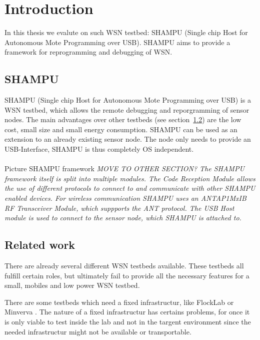 \chapter{Introduction}


In this thesis we evalute on such WSN testbed: SHAMPU (Single chip Host for Autonomous Mote Programming over USB). SHAMPU aims to provide a framework for reprogramming and debugging of WSN. 


\section{SHAMPU}

SHAMPU (Single chip Host for Autonomous Mote Programming over USB) \cite{Smeets:2014:DAL:2602339.2602401} is a WSN testbed, which allows the remote debugging and reporgramming of sensor nodes. The main advantages over other testbeds (see section~\ref{sec:related_work}) are the low cost, small size and small energy consumption. SHAMPU can be used as an extension to an already existing sensor node. The node only needs to provide an USB-Interface, SHAMPU is thus completely OS independent.\\\\

Picture SHAMPU framework
\textit{ MOVE TO OTHER SECTION?
The SHAMPU framework itself is split into multiple modules. The Code Reception Module allows the use of different protocols to connect to and communicate with other SHAMPU enabled devices. For wireless communication SHAMPU uses an ANTAP1MxIB RF Transceiver Module, which suppports the ANT protocol. The USB Host module is used to connect to the sensor node, which SHAMPU is attached to. }

\section{Related work}
\label{sec:related_work}

There are already several different WSN testbeds available. These testbeds all fulfill certain roles, but ultimately fail to provide all the necessary features for a small, mobiles and low power WSN testbed.

There are some testbeds which need a fixed infrastructur, like FlockLab \cite{Lim2013} or Minverva \cite{Sommer}. The nature of a fixed infrastructur has certains problems, for once it is only viable to test inside the lab and not in the targent environment since the needed infrastructur might not be available or transportable. 

